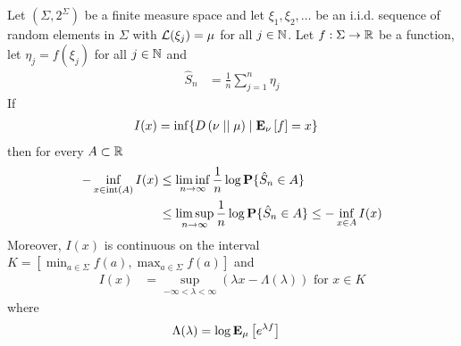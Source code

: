 \begin{thm}\label{CramersFiniteAlphabet}Let $(\Sigma,2^\Sigma)$ be a finite measure space and let $\xi_1, \xi_2, \dotsc$ be an i.i.d. sequence of random elements
in $\Sigma$ with $\mathcal{L}(\xi_j) = \mu$ for all $j \in \mathbb{N}$.  Let $f : \Sigma \to \mathbb{R}$ be a function, let $\eta_j = f(\xi_j)$ for all $j \in \mathbb{N}$ and
\begin{align*}
\hat{S}_n &= \frac{1}{n} \sum_{j=1}^n \eta_j
\end{align*}
If 
\begin{align*}
I(x) &= \inf \lbrace D\left( \nu \mid\mid \mu \right) \mid \textbf{E}_{\nu}\left [f \right]=x \rbrace
\end{align*}
then for every $A \subset \mathbb{R}$
\begin{align*}
-\inf_{x \in \operatorname*{int}(A)} I(x) 
&\leq \liminf_{n \to \infty} \frac{1}{n} \log \textbf{P}\{\hat{S}_n \in A\} \\
&\leq \limsup_{n \to \infty} \frac{1}{n} \log \textbf{P}\{\hat{S}_n \in A\} 
\leq -\inf_{x \in A} I(x)\\
\end{align*}
Moreover, $I(x)$ is continuous on the interval $K=[\min_{a \in \Sigma}f(a), \max_{a \in \Sigma} f(a)]$ and 
\begin{align*}
I(x) &= \sup_{-\infty < \lambda < \infty} (\lambda x - \Lambda(\lambda)) \text{ for $x \in K$}
\end{align*}
where 
\begin{align*}
\Lambda(\lambda) &= \log \textbf{E}_{\mu}\left [e^{\lambda f} \right]
\end{align*}
\end{thm}
